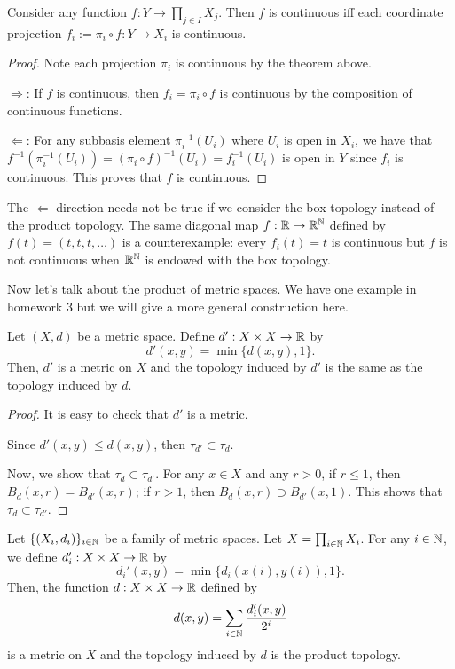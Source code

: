 \begin{theorem}\label{theorem: product continuous}
  Consider any function $f:Y\to \prod_{j\in I} X_j$. Then $f$ is continuous iff each coordinate projection $f_i:=\pi_i\circ f:Y\to X_i$ is continuous.
\end{theorem}
\begin{proof}
  Note each projection $\pi_i$ is continuous by the theorem above.

  $\Rightarrow$: If $f$ is continuous, then $f_i=\pi_i\circ f$ is continuous by the composition of continuous functions.

  $\Leftarrow$: For any subbasis element $\pi_{i}^{-1}(U_{i})$ where $U_i$ is open in $X_i$, we have that $f^{-1}(\pi_{i}^{-1}(U_{i})) = (\pi_i \circ f)^{-1}(U_i) = f_i^{-1}(U_i)$ is open in $Y$ since $f_i$ is continuous. This proves that $f$ is continuous.
\end{proof}

\begin{remark}
  The $\Leftarrow$ direction needs not be true if we consider the box topology instead of the product topology. The same diagonal map $f:\mathbb{R}\to\mathbb{R}^{\mathbb{N}}$ defined by $f(t)=(t,t,t,\ldots)$ is a counterexample: every $f_i(t)=t$ is continuous but $f$ is not continuous when $\mathbb{R}^{\mathbb{N}}$ is endowed with the box topology.
\end{remark}


Now let's talk about the product of metric spaces. We have one example in homework 3  but we will give a more general construction here.

\begin{lemma}
  Let $(X,d)$ be a metric space. Define $d':X\times X\to\mathbb{R}$ by
  \[d'(x,y)=\min\{d(x,y),1\}.\]
Then, $d'$ is a metric on $X$ and the topology induced by $d'$ is the same as the topology induced by $d$.
\end{lemma}
\begin{proof}
  It is easy to check that $d'$ is a metric. 

  Since $d'(x,y)\le d(x,y)$, then $\tau_{d'}\subset \tau_d$.

  Now, we show that $\tau_d\subset \tau_{d'}$. For any $x\in X$ and any $r>0$, if $r\le 1$, then $B_d(x,r)=B_{d'}(x,r)$; if $r>1$, then $B_d(x,r)\supset B_{d'}(x,1)$. This shows that $\tau_d\subset \tau_{d'}$.
\end{proof}
\begin{theorem}
  Let $\{(X_i,d_i)\}_{i\in\mathbb{N}}$ be a family of metric spaces. Let $X=\prod_{i\in \mathbb{N}} X_i$. For any $i\in \mathbb{N}$, we define $d_i':X\times X\to\mathbb{R}$ by
  \[d_i'(x,y)=\min\{d_i(x(i),y(i)),1\}.\]
Then, the function $d:X\times X\to\mathbb{R}$ defined by
\[d(x,y)=\sum_{i\in \mathbb{N}} \frac{d_i'(x,y)}{2^i}\]
is a metric on $X$ and the topology induced by $d$ is the product topology.
\end{theorem}

